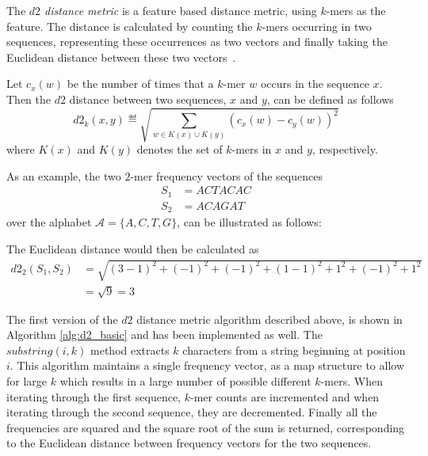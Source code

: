 The \emph{$d2$ distance metric} is a feature based distance metric, using
$k$-mers as the feature. The distance is calculated by counting the $k$-mers
occurring in two sequences, representing these occurrences as two vectors and
finally taking the Euclidean distance between these two
vectors~\cite[pp.~53--54]{dong}.

Let $c_x(w)$ be the number of times that a $k$-mer $w$ occurs in the sequence
$x$. Then the $d2$ distance between two sequences, $x$ and $y$, can be defined
as follows~\cite[pp.~1--2]{hazelhurst}
\[
  d2_k(x,y) \eqdef \sqrt{\sum_{w \in K(x) \cup K(y)} (c_x(w) - c_y(w))^2}
\]
where $K(x)$ and $K(y)$ denotes the set of $k$-mers in $x$ and $y$,
respectively.

As an example, the two $2$-mer frequency vectors of the sequences
\begin{align*}
  S_1 &= ACTACAC \\
  S_2 &= ACAGAT
\end{align*}
over the alphabet $\mathcal{A} = \{A,C,T,G\}$, can be illustrated as follows:

\begin{table}[!h]
\centering
{}
\end{table}

The Euclidean distance would then be calculated as
\begin{align*}
  d2_2(S_1, S_2)
    &= \sqrt{(3-1)^2 + (-1)^2 + (-1)^2 + (1-1)^2 + 1^2 + (-1)^2 + 1^2} \\
    &= \sqrt{9} = 3
\end{align*}

The first version of the $d2$ distance metric algorithm described above, is
shown in Algorithm \ref{alg:d2_basic} and has been implemented as well. The
$substring(i,k)$ method extracts $k$ characters from a string beginning
at position $i$. This algorithm maintains a single frequency vector, as a map
structure to allow for large $k$ which results in a large number of possible
different $k$-mers. When iterating through the first sequence, $k$-mer counts
are incremented and when iterating through the second sequence, they are
decremented. Finally all the frequencies are squared and the square root of
the sum is returned, corresponding to the Euclidean distance between frequency
vectors for the two sequences.


